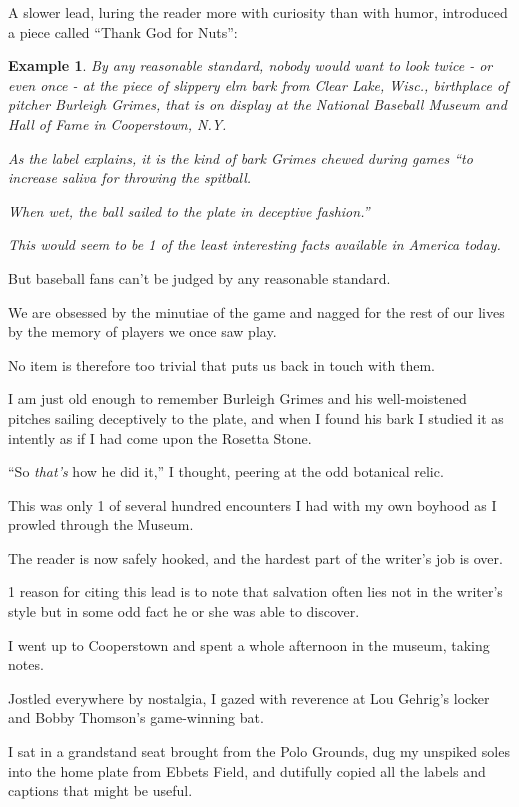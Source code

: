 \documentclass{book}
\numberwithin{equation}{section}
\newtheorem{example}{Example}[chapter]
\begin{document}
%
A slower lead, luring the reader more with curiosity than with humor, introduced a piece called ``Thank God for Nuts'':
\begin{example}
    By any reasonable standard, nobody would want to look twice - or even once - at the piece of slippery elm bark from Clear Lake, Wisc., birthplace of pitcher Burleigh Grimes, that is on display at the National Baseball Museum and Hall of Fame in Cooperstown, N.Y.
    
    As the label explains, it is the kind of bark Grimes chewed during games ``to increase saliva for throwing the spitball.
    
    When wet, the ball sailed to the plate in deceptive fashion.''
    
    This would seem to be 1 of the least interesting facts available in America today.
\end{example}
But baseball fans can't be judged by any reasonable standard.

We are obsessed by the minutiae of the game and nagged for the rest of our lives by the memory of players we once saw play.

No item is therefore too trivial that puts us back in touch with them.

I am just old enough to remember Burleigh Grimes and his well-moistened pitches sailing deceptively to the plate, and when I found his bark I studied it as intently as if I had come upon the Rosetta Stone.

``So \textit{that's} how he did it,'' I thought, peering at the odd botanical relic.

This was only 1 of several hundred encounters I had with my own boyhood as I prowled through the Museum.


The reader is now safely hooked, and the hardest part of the writer's job is over.

%
1 reason for citing this lead is to note that salvation often lies not in the writer's style but in some odd fact he or she was able to discover.

I went up to Cooperstown and spent a whole afternoon in the museum, taking notes.

Jostled everywhere by nostalgia, I gazed with reverence at Lou Gehrig's locker and Bobby Thomson's game-winning bat.

I sat in a grandstand seat brought from the Polo Grounds, dug my unspiked soles into the home plate from Ebbets Field, and dutifully copied all the labels and captions that might be useful.
\end{document}
